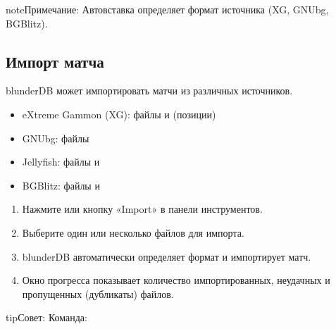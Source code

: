 \documentclass[letterpaper,10pt,russian]{sphinxmanual}
\begin{document}
\begin{sphinxadmonition}{note}{Примечание:}
\sphinxAtStartPar
Автовставка определяет формат источника (XG, GNUbg, BGBlitz).
\end{sphinxadmonition}


\subsection{Импорт матча}
\label{\detokenize{guide_utilisateur:importer-un-match}}
\sphinxAtStartPar
blunderDB может импортировать матчи из различных источников.

\sphinxAtStartPar
{}
\begin{itemize}
\item {} 
\sphinxAtStartPar
eXtreme Gammon (XG): файлы  и  (позиции)

\item {} 
\sphinxAtStartPar
GNUbg: файлы 

\item {} 
\sphinxAtStartPar
Jellyfish: файлы  и 

\item {} 
\sphinxAtStartPar
BGBlitz: файлы  и 

\end{itemize}

\sphinxAtStartPar
{}
\begin{enumerate}
%
\item {} 
\sphinxAtStartPar
Нажмите  или кнопку «Import» в панели инструментов.

\item {} 
\sphinxAtStartPar
Выберите один или несколько файлов для импорта.

\item {} 
\sphinxAtStartPar
blunderDB автоматически определяет формат и импортирует матч.

\item {} 
\sphinxAtStartPar
Окно прогресса показывает количество импортированных, неудачных и пропущенных (дубликаты) файлов.

\end{enumerate}

\begin{sphinxadmonition}{tip}{Совет:}
\sphinxAtStartPar
Команда: 
\end{sphinxadmonition}
\end{document}
